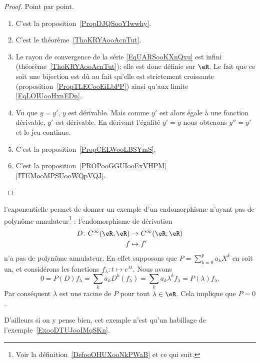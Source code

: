 \begin{proof}
    Point par point.
    \begin{enumerate}
        \item
            C'est la proposition~\ref{PropDJQSooYIwwhy}.
        \item
            C'est le théorème~\ref{ThoKRYAooAcnTut}.
        \item
            Le rayon de convergence de la série \eqref{EqUARSooKXnQxu} est infini (théorème~\ref{ThoKRYAooAcnTut}); elle est donc définie sur \( \eR\). Le fait que ce soit une bijection est dû au fait qu'elle est strictement croissante (proposition~\ref{PropTLECooEiLbPP}) ainsi qu'aux limite \eqref{EqLOIUooHxnEDn}.
        \item
            Vu que \( y=y'\), \( y\) est dérivable. Mais comme \( y'\) est alors égale à une fonction dérivable, \( y'\) est dérivable. En dérivant l'égalité \( y'=y\) nous obtenons \( y''=y'\) et le jeu continue.
        \item
            C'est la proposition~\ref{PropCELWooLBSYmS}.
        \item
            C'est la proposition~\ref{PROPooGGUIooExVHPM}\ref{ITEMooMPSUooWQpVQJ}.
    \end{enumerate}
\end{proof}

\begin{example}     \label{ExooLRHCooMYLQTU}
    l'exponentielle permet de donner un exemple d'un endomorphisme n'ayant pas de polynôme annulateur\footnote{Voir la définition~\ref{DefooOHUXooNkPWaB} et ce qui suit.} : l'endomorphisme de dérivation
    \begin{equation}
        \begin{aligned}
            D\colon C^{\infty}(\eR,\eR)&\to  C^{\infty}(\eR,\eR) \\
            f&\mapsto f'
        \end{aligned}
    \end{equation}
    n'a pas de polynôme annulateur. En effet supposons que \( P=\sum_{k=0}^{p}a_kX^k\) en soit un, et considérons les fonctions \( f_{\lambda}\colon t\mapsto  e^{\lambda t}\). Nous avons
    \begin{equation}
            0=P(D)f_{\lambda}
            =\sum_ka_kD^k(f_{\lambda})
            =\sum_ka_k\lambda^kf_{\lambda}
            =P(\lambda)f_{\lambda}.
    \end{equation}
    Par conséquent \( \lambda\) est une racine de \( P\) pour tout \( \lambda\in \eR\). Cela implique que \( P=0\).

    D'ailleurs si on y pense bien, cet exemple n'est qu'un habillage de l'exemple~\ref{ExooDTUJooIMqSKn}.
\end{example}

